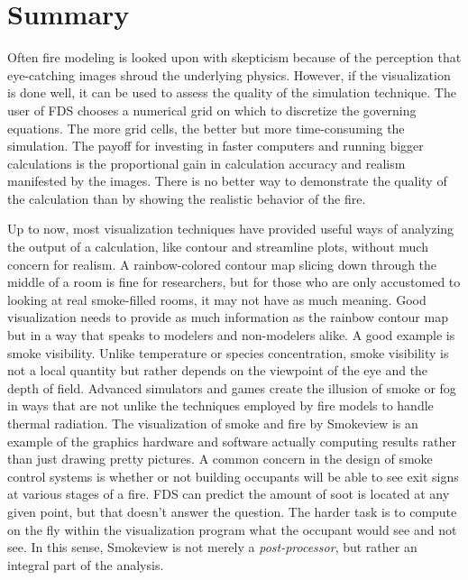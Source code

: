 \documentclass[11pt,twoside]{book}
\begin{document}

\chapter{Summary}
Often fire modeling is looked upon with skepticism because of the
perception that eye-catching images shroud the underlying physics.
However, if the visualization is done well, it can be used to
assess the quality of the simulation technique. The user of FDS
chooses a numerical grid on which to discretize the governing
equations. The more grid cells, the better but more time-consuming
the simulation. The payoff for investing in faster computers and
running bigger calculations is the proportional gain in calculation accuracy and realism
manifested by the images. There is no better way to demonstrate
the quality of the calculation than by showing the realistic
behavior of the fire.

Up to now, most visualization techniques have provided useful ways
of analyzing the output of a calculation, like contour and
streamline plots, without much concern for realism. A
rainbow-colored contour map slicing down through the middle of a
room is fine for researchers, but for those who are only
accustomed to looking at real smoke-filled rooms, it may not have
as much meaning. Good visualization needs to provide as much
information as the rainbow contour map but in a way that speaks to
modelers and non-modelers alike. A good example is smoke
visibility. Unlike temperature or species concentration, smoke
visibility is not a local quantity but rather depends on the
viewpoint of the eye and the depth of field. Advanced simulators
and games create the illusion of smoke or fog in ways that are not
unlike the techniques employed by fire models to handle thermal
radiation. The visualization of smoke and fire by Smokeview is an
example of the graphics hardware and software actually computing
results rather than just drawing pretty pictures. A common concern
in the design of smoke control systems is whether or not building
occupants will be able to see exit signs at various stages of a
fire. FDS can predict the amount of soot is located at any given
point, but that doesn't answer the question. The harder task is to
compute on the fly within the visualization program what the
occupant would see and not see. In this sense, Smokeview is not
merely a {\em post-processor}, but rather an integral part of the
analysis.
\end{document}
